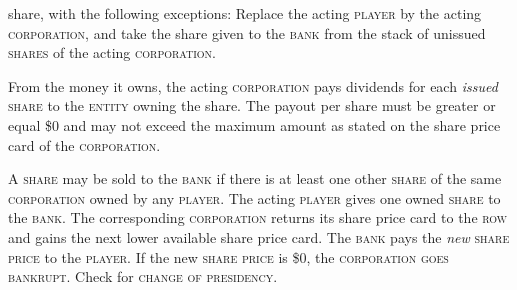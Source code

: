 \documentclass[11pt,a4paper]{article}
\newenvironment{my_description}
  {\begin{list}{}{\setlength{\labelwidth}{0pt}
   \leftmargin=1.2em
   \setlength{\itemindent}{-\leftmargin}
   \renewcommand{\makelabel}{\descriptionlabel}}
  \setlength{\itemsep}{1pt}
  \setlength{\parskip}{0pt}
  \setlength{\parsep}{0pt}
  }
  {\end{list}}
\begin{document}
\begin{multicols}{2}
{\begin{my_description}
{    share}, with the following exceptions: Replace the acting
  \textsc{player} by the acting \textsc{corporation}, and take the
  share given to the \textsc{bank} from the stack of unissued
  \textsc{shares} of the acting \textsc{corporation}.
\item[Pay dividends] From the money it owns, the acting
  \textsc{corporation} pays dividends for each \emph{issued}
  \textsc{share} to the \textsc{entity} owning the share. The payout
  per share must be greater or equal \$0 and may not exceed the
  maximum amount as stated on the share price card of the
  \textsc{corporation}.
\item[Sell one share] A \textsc{share} may be sold to the
  \textsc{bank} if there is at least one other
  \textsc{share} of the same \textsc{corporation} owned by any
  \textsc{player}.  The acting \textsc{player} gives one owned
  \textsc{share} to the \textsc{bank}. The corresponding
  \textsc{corporation} returns its share price card to the
  \textsc{row} and gains the next lower available share price
  card. The \textsc{bank} pays the \emph{new} \textsc{share price} to
  the \textsc{player}. If the new \textsc{share price} is \$0, the
  \textsc{corporation} \textsc{goes bankrupt}. Check for
  \textsc{change of presidency}.
\end{my_description}

}

\end{multicols}
\end{document}

